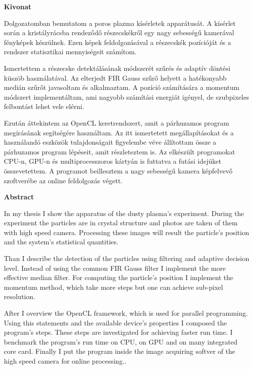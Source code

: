 \begin{center}
	\huge
	\textbf{Kivonat}
\end{center}


	Dolgozatomban bemutatom a poros plazma kísérletek apparátusát.
	A kísérlet során a kristályrácsba rendeződő részecskékről egy nagy sebességű kamerával fényképek készülnek.
	Ezen képek feldolgozásával a részecskék pozícióját és a rendszer statisztikai mennyiségeit számítom.
	
	Ismertettem a részecske detektálásának módszerét szűrés és adaptív döntési küszöb használatával.
	Az elterjedt FIR Gauss szűrő helyett a hatékonyabb medián szűrőt javasoltam és alkalmaztam.
	A pozíció számítására a momentum módszert implementáltam, ami nagyobb számítási energiát igényel, de szubpixeles felbontást lehet vele elérni.
	
	Ezután áttekintem az OpenCL keretrendszert, amit a párhuzamos program megírásának segítségére használtam.
	Az itt ismertetett megállapításokat és a használandó eszközök tulajdonságait figyelembe véve állítottam össze a párhuzamos program lépéseit, amit részleteztem is.
	Az elkészült programokat CPU-n, GPU-n és multiprocesszoros kártyán is futtatva a futási idejüket összevetettem.
	A programot beillesztem a nagy sebességű kamera képfelvevő szoftverébe az online feldolgozás végett.

\newpage


\begin{center}
	\huge
	\textbf{Abstract}
\end{center}

	In my thesis I show the apparatus of the dusty plasma's experiment.
	During the experiment the particles are in crystal structure and photos are taken of them with high speed camera.
	Processing these images will result the particle's position and the system's statistical quantities.
	
	Than I describe the detection of the particles using filtering and adaptive decision level.
	Instead of using the common FIR Gauss filter I implement the more effective median filter.
	For computing the particle's position I implement the momentum method, which take more steps but one can achieve sub-pixel resolution.
	
	After I overview the OpenCL framework, which is used for parallel programming.
	Using this statements and the available device's properties I composed the program's steps.
	These steps are investigated for achieving faster run time.
	I benchmark the program's run time on CPU, on GPU and on many integrated core card.
	Finally I put the program inside the image acquiring softver of the high speed camera for online processing..
	